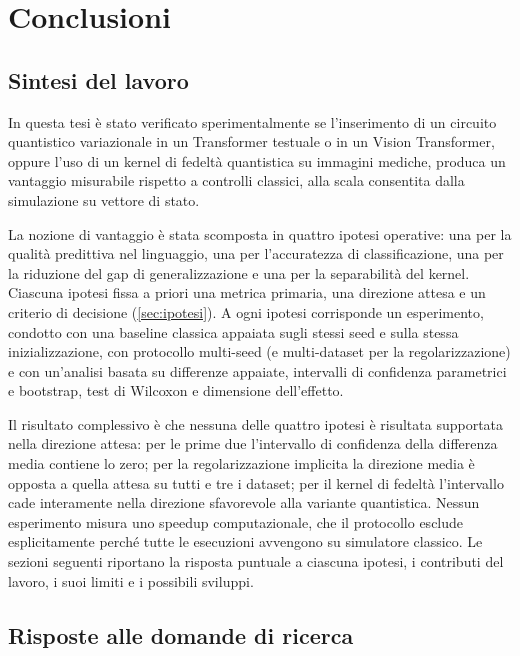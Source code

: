 \chapter{Conclusioni}
\label{cap:conclusioni}

\section{Sintesi del lavoro}
\label{sec:sintesi-conclusioni}

In questa tesi è stato verificato sperimentalmente se l'inserimento di un circuito
quantistico variazionale in un Transformer testuale o in un Vision Transformer,
oppure l'uso di un kernel di fedeltà quantistica su immagini mediche, produca un
vantaggio misurabile rispetto a controlli classici, alla scala consentita dalla
simulazione su vettore di stato.

La nozione di vantaggio è stata scomposta in quattro ipotesi operative: una per
la qualità predittiva nel linguaggio, una per l'accuratezza di classificazione,
una per la riduzione del gap di generalizzazione e una per la separabilità del
kernel. Ciascuna ipotesi fissa a priori una metrica primaria, una direzione
attesa e un criterio di decisione (\cref{sec:ipotesi}). A ogni ipotesi corrisponde un
esperimento, condotto con una baseline classica appaiata sugli stessi seed e sulla
stessa inizializzazione, con protocollo multi-seed (e multi-dataset per la
regolarizzazione) e con un'analisi basata su differenze appaiate, intervalli di
confidenza parametrici e bootstrap, test di Wilcoxon e dimensione dell'effetto.

Il risultato complessivo è che nessuna delle quattro ipotesi è risultata
supportata nella direzione attesa: per le prime due l'intervallo di confidenza
della differenza media contiene lo zero; per la regolarizzazione implicita la
direzione media è opposta a quella attesa su tutti e tre i dataset; per il kernel
di fedeltà l'intervallo cade interamente nella direzione sfavorevole alla variante
quantistica. Nessun esperimento misura uno speedup computazionale, che il
protocollo esclude esplicitamente perché tutte le esecuzioni avvengono su
simulatore classico. Le sezioni seguenti riportano la risposta puntuale a ciascuna
ipotesi, i contributi del lavoro, i suoi limiti e i possibili sviluppi.

\section{Risposte alle domande di ricerca}
\label{sec:risposte}

